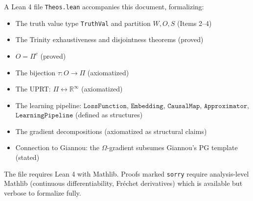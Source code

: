 \documentclass[11pt,a4paper]{article}
\newcommand{\R}{\mathbb{R}}
\begin{document}
A Lean 4 file \texttt{Theos.lean} accompanies this document, formalizing:
\begin{itemize}[nosep]
\item The truth value type \texttt{TruthVal} and partition $W, O, S$ (Items 2--4)
\item The Trinity exhaustiveness and disjointness theorems (proved)
\item $O = \Pi^c$ (proved)
\item The bijection $\tau : O \to \Pi$ (axiomatized)
\item The UPRT: $\Pi \leftrightarrow \R^\infty$ (axiomatized)
\item The learning pipeline: $\texttt{LossFunction}$, $\texttt{Embedding}$, $\texttt{CausalMap}$, $\texttt{Approximator}$, $\texttt{LearningPipeline}$ (defined as structures)
\item The gradient decompositions (axiomatized as structural claims)
\item Connection to Giannou: the $\Omega$-gradient subsumes Giannou's PG template (stated)
\end{itemize}

The file requires Lean 4 with Mathlib. Proofs marked \texttt{sorry} require analysis-level Mathlib (continuous differentiability, Fr\'echet derivatives) which is available but verbose to formalize fully.
\end{document}
